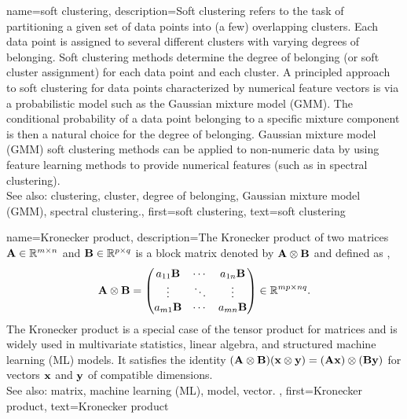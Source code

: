 {
{name={soft clustering}, 
	description={Soft clustering 
		refers to the task of partitioning a given set of data points into (a few) 
		overlapping clusters. Each data point is assigned to several different 
		clusters with varying degrees of belonging. Soft clustering methods determine the 
		degree of belonging (or soft cluster assignment) for each data point and each cluster.
		A principled approach to soft clustering for data points characterized by 
		numerical feature vectors is via a probabilistic model such as the Gaussian mixture model (GMM). 
		The conditional probability of a data point belonging to a specific mixture 
		component is then a natural choice for the degree of belonging. Gaussian mixture model (GMM) soft clustering 
		methods can be applied to non-numeric data by using feature learning methods 
		to provide numerical features (such as in spectral clustering). 
				\\
		See also: clustering, cluster, degree of belonging, Gaussian mixture model (GMM), spectral clustering.},
	first={soft clustering},
	text={soft clustering} 
}

{name={Kronecker product}, 
	description={The Kronecker product  of two matrices ${\bf A} \in \mathbb{R}^{m \times n}$ 
		and ${\bf B} \in \mathbb{R}^{p \times q}$ is a block matrix denoted by ${\bf A} \otimes {\bf B}$ 
	 	and defined as \cite{GolubVanLoanBook}, \cite{HornMatAnalysis}
    		\[
      		{\bf A} \otimes {\bf B} =
      		\begin{pmatrix}
        		a_{11}{\bf B} & \cdots & a_{1n}{\bf B} \\
        		\vdots & \ddots & \vdots \\
        		a_{m1}{\bf B} & \cdots & a_{mn}{\bf B}
      		\end{pmatrix}
      		\in \mathbb{R}^{mp \times nq}.
    		\]
    		The Kronecker product is a special case of the tensor product for matrices and is 
		widely used in multivariate statistics, linear algebra, and structured machine learning (ML) models. 
		It satisfies the identity $({\bf A} \otimes {\bf B})({\bf x} \otimes {\bf y}) = ({\bf A}{\bf x}) \otimes ({\bf B}{\bf y})$ 
		for vectors ${\bf x}$ and ${\bf y}$ of compatible dimensions.
		\\
		See also: matrix, machine learning (ML), model, vector. },
	first={Kronecker product},
	text={Kronecker product} 
}
	
}
